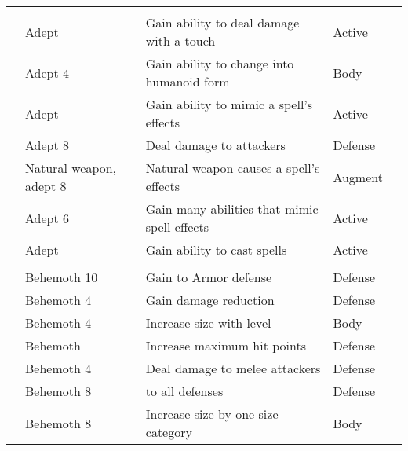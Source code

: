 \begin{longtabuwrapper}
\begin{longtabu}{>{\lcol}p{10em} >{\lcol}p{15em} >{\lcol}X >{\lcol}p{8em} >{\lcol}p{3em}}
            \midrule
            \label{Adept Traits} &  &  &  &  \\
             & Adept & Gain ability to deal damage with a touch & Active &  \\
             & Adept 4 & Gain ability to change into humanoid form & Body &  \\
             & Adept & Gain ability to mimic a spell's effects & Active &  \\
             & Adept 8 & Deal damage to attackers & Defense &  \\
             & Natural weapon, adept 8 & Natural weapon causes a spell's effects & Augment &  \\
             & Adept 6 & Gain many abilities that mimic spell effects & Active &  \\
             & Adept & Gain ability to cast spells & Active &  \\

            \midrule
            \label{Behemoth Traits} &  &  &  &  \\
             & Behemoth 10 & Gain  to Armor defense & Defense &  \\
             & Behemoth 4 & Gain damage reduction & Defense &  \\
             & Behemoth 4 & Increase size with level & Body &  \\
             & Behemoth & Increase maximum hit points & Defense &  \\
             & Behemoth 4 & Deal damage to melee attackers & Defense &  \\
             & Behemoth 8 &  to all defenses & Defense &  \\
             & Behemoth 8 & Increase size by one size category & Body &  \\


\end{longtabu}
\end{longtabuwrapper}
